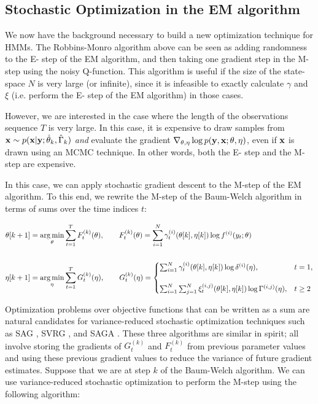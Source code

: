 
\subsection{Stochastic Optimization in the EM algorithm}

We now have the background necessary to build a new optimization technique for HMMs. The Robbins-Monro algorithm above can be seen as adding randomness to the E- step of the EM algorithm, and then taking one gradient step in the M-step using the noisy Q-function. This algorithm is useful if the size of the state-space $N$ is very large (or infinite), since it is infeasible to exactly calculate $\gamma$ and $\xi$ (i.e. perform the E- step of the EM algorithm) in those cases. 

However, we are interested in the case where the length of the observations sequence $T$ is very large. In this case, it is expensive to draw samples from $\mathbf{x} \sim p(\mathbf{x} | \mathbf{y} ; \hat \theta_k, \hat \Gamma_k)$ \textit{and} evaluate the gradient $\nabla_{\theta,\eta} \log p(\mathbf{y},\mathbf{x};\theta,\eta)$, even if $\mathbf{x}$ is drawn using an MCMC technique. In other words, both the E- step and the M- step are expensive.

In this case, we can apply stochastic gradient descent to the M-step of the EM algorithm. To this end, we rewrite the M-step of the Baum-Welch algorithm in terms of sums over the time indices $t$:

\begin{align}
    \theta[k+1] &= \operatorname*{arg\,min}_{\theta} \sum_{t=1}^T F_t^{(k)}(\theta), \qquad F_t^{(k)}(\theta) = \sum_{i=1}^N \gamma^{(i)}_t(\theta[k], \eta[k]) \log f^{(i)}(y_t;\theta) \label{eqn:F} \\ \nonumber \\
    \eta[k+1] &= \operatorname*{arg\,min}_{\eta} \sum_{t=1}^{T} G_t^{(k)}(\eta), 
    \qquad G_t^{(k)}(\eta) = 
    \begin{cases}
        \sum_{i=1}^N \gamma^{(i)}_t(\theta[k],\eta[k]) \log \delta^{(i)}(\eta), & t = 1, \\\\
        \sum_{i=1}^N \sum_{j=1}^N \xi^{(i,j)}_t(\theta[k], \eta[k]) \log \Gamma^{(i,j)}(\eta), & t \geq 2
    \end{cases}
    \label{eqn:G}
\end{align}

Optimization problems over objective functions that can be written as a sum are natural candidates for variance-reduced stochastic optimization techniques such as SAG \citep{Schmidt:2017}, SVRG \citep{Johnson:2013}, and SAGA \citep{Defazio:2014}. These three algorithms are similar in spirit; all involve storing the gradients of $G_t^{(k)}$ and $F_t^{(k)}$ from previous parameter values and using these previous gradient values to reduce the variance of future gradient estimates. Suppose that we are at step $k$ of the Baum-Welch algorithm. We can use variance-reduced stochastic optimization to perform the M-step using the following algorithm:

